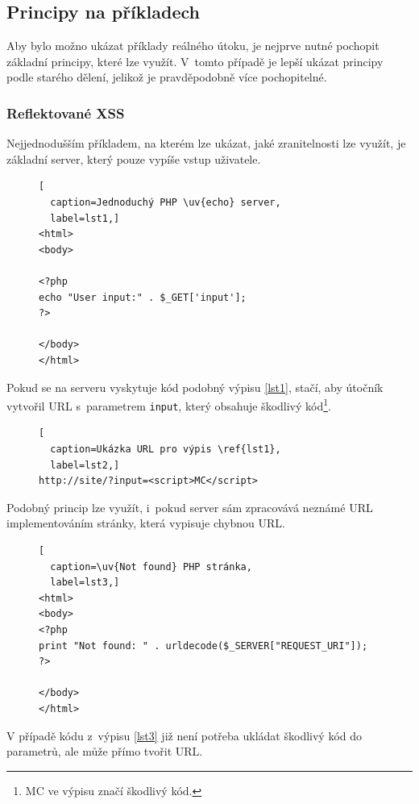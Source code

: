 \documentclass[11pt, conference, a4paper]{IEEEtran}
\begin{document}
\subsection{Principy na příkladech}
Aby bylo možno ukázat příklady reálného útoku, je nejprve nutné pochopit základní principy, které lze využít. V~tomto případě je lepší ukázat principy podle starého dělení, jelikož je pravděpodobně více pochopitelné.

\subsubsection{Reflektované XSS}
Nejjednodušším příkladem, na kterém lze ukázat, jaké zranitelnosti lze využít, je základní  server, který pouze vypíše vstup uživatele.

\begin{figure}[H]
\begin{lstlisting}[
  caption=Jednoduchý PHP \uv{echo} server,
  label=lst1,]
<html>
<body>

<?php
echo "User input:" . $_GET['input'];
?>

</body>
</html>
\end{lstlisting}
\end{figure}

Pokud se na serveru vyskytuje kód podobný výpisu \ref{lst1}, stačí, aby útočník vytvořil URL s~parametrem \texttt{input}, který obsahuje škodlivý kód\footnote{MC ve výpisu značí škodlivý kód.}. 

\begin{figure}[H]
\begin{lstlisting}[
  caption=Ukázka URL pro výpis \ref{lst1},
  label=lst2,]
http://site/?input=<script>MC</script>
\end{lstlisting}
\end{figure}

Podobný princip lze využít, i~pokud server sám zpracovává neznámé URL implementováním  stránky, která vypisuje chybnou URL.

\begin{figure}[H]
\begin{lstlisting}[
  caption=\uv{Not found} PHP stránka,
  label=lst3,]
<html>
<body>
<?php
print "Not found: " . urldecode($_SERVER["REQUEST_URI"]);
?>

</body>
</html>
\end{lstlisting}
\end{figure}

V případě kódu z~výpisu \ref{lst3} již není potřeba ukládat škodlivý kód do parametrů, ale může přímo tvořit URL.
\end{document}
